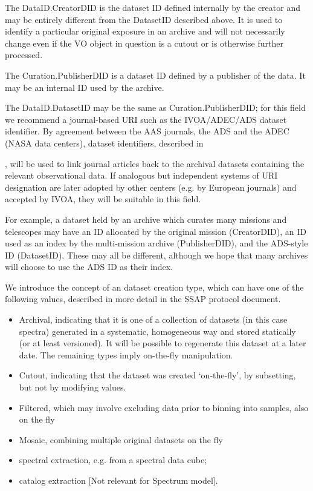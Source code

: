 \documentclass[11pt]{article}
\newcommand{\link}[1]{{\color{dblue}\htmladdnormallink{#1}\par}}
\begin{document}
The DataID.CreatorDID is the dataset ID defined internally by
the creator and may be entirely different from the DatasetID described
above. It is used to identify a particular original exposure in an archive
and will not necessarily change even if the VO object in question is a cutout or
is otherwise further processed.

The Curation.PublisherDID is a dataset ID defined by a publisher
of the data. It may be an internal ID used by the archive.

The DataID.DatasetID may be the same as Curation.PublisherDID;
for this field we recommend a journal-based URI such
as the IVOA/ADEC/ADS dataset identifier.
By agreement between the AAS journals, the ADS and the ADEC (NASA data centers),
dataset identifiers, described in 
\link{http://vo.ads.harvard.edu/dv/},
will be used to link journal articles back
to the archival datasets containing the relevant observational data.
If analogous but independent systems of URI designation are later
adopted by other centers (e.g. by European journals) and accepted by IVOA,
they will be suitable in this field.

For example, a dataset held by an archive which curates many
missions and telescopes may have an ID allocated by the original
mission (CreatorDID), an ID used as an index by the multi-mission archive (PublisherDID),
and the ADS-style ID (DatasetID). These may all be different, although
we hope that many archives will choose to use the ADS ID as their index.

We introduce the concept of an dataset creation type, which
can have one of the following  values, described in more
detail in the SSAP protocol document.

\begin{itemize}

\item Archival, indicating that it is one of a collection of
datasets (in this case spectra) generated in a systematic, homogeneous
way and stored statically (or at least versioned). It will be possible
to regenerate this dataset at a later date. The remaining types
imply on-the-fly manipulation.

\item Cutout, indicating that the dataset was created `on-the-fly',
by subsetting, but not by modifying values.

\item Filtered,  which may involve excluding data prior
to binning into samples, also on the fly

\item Mosaic, combining multiple original datasets on the fly

\item spectral extraction, e.g. from a spectral data cube;

\item catalog extraction [Not relevant for Spectrum model].

\end{itemize}
\end{document}
